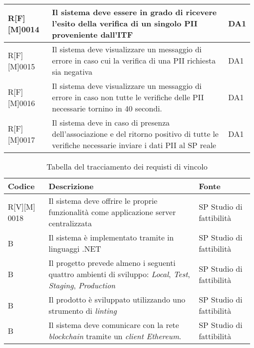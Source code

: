 \begin{center}
\begin{longtable}{|p{2cm}|p{9cm}|p{2cm}|}
\hline
R[F][M]0014     & Il sistema deve essere in grado di ricevere l’esito della verifica di un singolo PII proveniente dall’ITF  & DA1 \\
\hline
R[F][M]0015     & Il sistema deve visualizzare un messaggio di errore in caso cui la verifica di una PII richiesta sia negativa & DA1 \\
\hline
R[F][M]0016     & Il sistema deve visualizzare un messaggio di errore in caso non tutte le verifiche delle PII necessarie tornino in 40 secondi. & DA1 \\
\hline
R[F][M]0017     & Il sistema deve in caso di presenza dell’associazione e del ritorno positivo di tutte le verifiche necessarie inviare i dati PII al SP reale & DA1 \\
\hline
\end{longtable}
\end{center}






\begin{center}
    \begin{longtable}{|p{2cm}|p{9cm}|p{2cm}|}%
    \caption{Tabella del tracciamento dei requisti di vincolo}
    \label{tab:requisiti-vincolo-sp}
    \endfirsthead
    \endhead
    \hline
    \textbf{Codice} & \textbf{Descrizione} & \textbf{Fonte}\\
    \hline
    R[V][M] 0018     & Il sistema deve offrire le proprie funzionalità come applicazione server centralizzata & SP Studio di fattibilità \\
    \hline
    B     & Il sistema è implementato tramite in linguaggi .NET & SP Studio di fattibilità \\
    \hline
    B     & Il progetto prevede almeno i seguenti quattro ambienti di sviluppo: \textit{Local}, \textit{Test}, \textit{Staging}, \textit{Production} & SP Studio di fattibilità \\
    \hline
    B     & Il prodotto è sviluppato utilizzando uno strumento di \textit{linting} & SP Studio di fattibilità \\
    \hline
    B     & Il sistema deve comunicare con la rete \textit{blockchain} tramite un \textit{client Ethereum}. & SP Studio di fattibilità \\
    \hline
    \end{longtable}
    \end{center}



